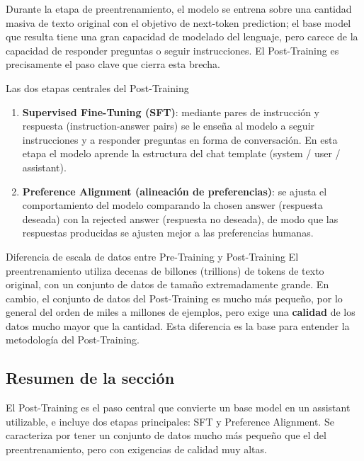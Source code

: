 \documentclass[a4paper]{article}
\begin{document}
Durante la etapa de preentrenamiento, el modelo se entrena sobre una cantidad masiva de texto original con el objetivo de next-token prediction; el base model que resulta tiene una gran capacidad de modelado del lenguaje, pero carece de la capacidad de responder preguntas o seguir instrucciones. El Post-Training es precisamente el paso clave que cierra esta brecha.

\begin{importantbox}{Las dos etapas centrales del Post-Training}
\begin{enumerate}
    \item \textbf{Supervised Fine-Tuning (SFT)}: mediante pares de instrucción y respuesta (instruction-answer pairs) se le enseña al modelo a seguir instrucciones y a responder preguntas en forma de conversación. En esta etapa el modelo aprende la estructura del chat template (system / user / assistant).
    \item \textbf{Preference Alignment (alineación de preferencias)}: se ajusta el comportamiento del modelo comparando la chosen answer (respuesta deseada) con la rejected answer (respuesta no deseada), de modo que las respuestas producidas se ajusten mejor a las preferencias humanas.
\end{enumerate}
\end{importantbox}

\begin{knowledgebox}{Diferencia de escala de datos entre Pre-Training y Post-Training}
El preentrenamiento utiliza decenas de billones (trillions) de tokens de texto original, con un conjunto de datos de tamaño extremadamente grande. En cambio, el conjunto de datos del Post-Training es mucho más pequeño, por lo general del orden de miles a millones de ejemplos, pero exige una \textbf{calidad} de los datos mucho mayor que la cantidad. Esta diferencia es la base para entender la metodología del Post-Training.
\end{knowledgebox}

\subsection{Resumen de la sección}

El Post-Training es el paso central que convierte un base model en un assistant utilizable, e incluye dos etapas principales: SFT y Preference Alignment. Se caracteriza por tener un conjunto de datos mucho más pequeño que el del preentrenamiento, pero con exigencias de calidad muy altas.
\end{document}
